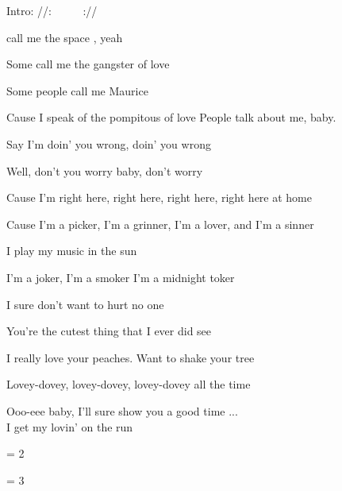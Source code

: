 
Intro: //: ~  ~  ~  ://

\zs
{}  call me the space , yeah~ ~ 

Some call me the gangster of love

Some people call me Maurice

Cause I speak of the pompitous of love
\ks
\zs
People talk about me, baby. 

Say I'm doin' you wrong, doin' you wrong

Well, don't you worry baby, don't worry

Cause I'm right here, right here, right here, right here at home
\ks
\zr

Cause I'm a picker, I'm a grinner, I'm a lover, and I'm a sinner

I play my music in the sun
\bigskip

I'm a joker, I'm a smoker I'm a midnight toker

I sure don't want to hurt no one
\kr

\zs
You're the cutest thing that I ever did see

I really love your peaches. Want to shake your tree

Lovey-dovey, lovey-dovey, lovey-dovey all the time

Ooo-eee baby, I'll sure show you a good time
\ks
\zr
...\\
I get my lovin' on the run
\kr

\zr\kr

\zs
= 2
\ks

\zs
= 3
\ks
\kp